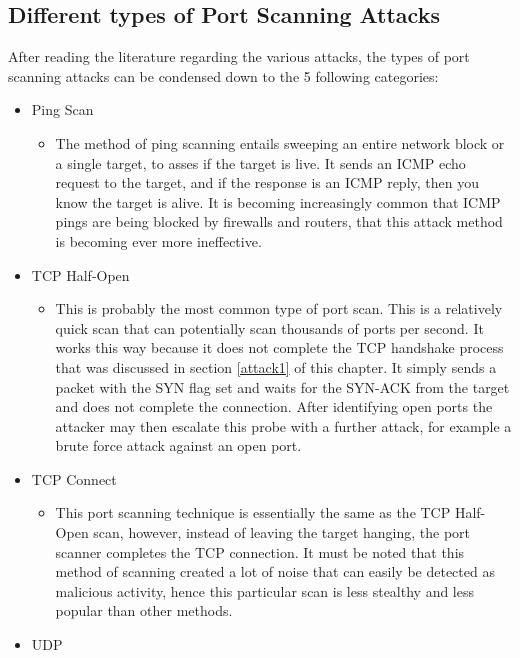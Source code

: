 \subsection{Different types of Port Scanning Attacks}

After reading the literature regarding the various attacks, the types of port scanning attacks can be condensed down to the 5 following categories:
\begin{itemize}
    \item Ping Scan
    \begin{itemize}
        \item The method of ping scanning entails sweeping an entire network block or a single target, to asses if the target is live. It sends an ICMP echo request to the target, and if the response is an ICMP reply, then you know the target is alive. It is becoming increasingly common that ICMP pings are being blocked by firewalls and routers, that this attack method is becoming ever more ineffective.
    \end{itemize}
    \item TCP Half-Open
    \begin{itemize}
        \item This is probably the most common type of port scan. This is a relatively quick scan that can potentially scan thousands of ports per second. It works this way because it does not complete the TCP handshake process that was discussed in section \ref{attack1} of this chapter. It simply sends a packet with the SYN flag set and waits for the SYN-ACK from the target and does not complete the connection. After identifying open ports the attacker may then escalate this probe with a further attack, for example a brute force attack against an open port.
    \end{itemize} 
    \item TCP Connect
    \begin{itemize}
        \item This port scanning technique is essentially the same as the TCP Half-Open scan, however, instead of leaving the target hanging, the port scanner completes the TCP connection. It must be noted that this method of scanning created a lot of noise that can easily be detected as malicious activity, hence this particular scan is less stealthy and less popular than other methods.
    \end{itemize}
    \item UDP
    \begin{itemize}

\end{itemize}
\end{itemize}

